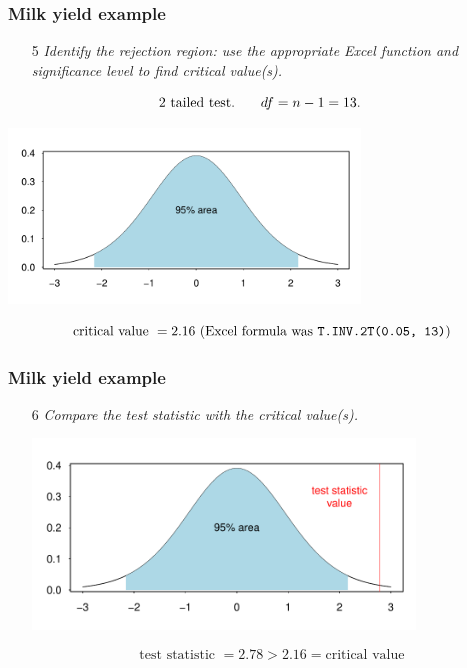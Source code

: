 \documentclass[12pt,xcolor=dvipsnames,handout,mathserif,aspectratio=169]{beamer}
\begin{document}
\begin{frame}
\frametitle{Milk yield example}
\begin{enumerate}
\item[5] \emph{Identify the rejection region: use the appropriate Excel function and significance level to find critical value(s).\\}
\end{enumerate}
$$\mbox{2 tailed test. } \hspace{0.5cm} df =  n - 1 = 13.$$ 
\vspace{-0.8cm}
\begin{center}
\includegraphics[width=0.7\textwidth]{t_plot.pdf}
\end{center}
$$\mbox{ critical value } = 2.16 \mbox{ (Excel formula was \texttt{T.INV.2T(0.05, 13)})}$$


\end{frame}

\begin{frame}\frametitle{Milk yield example}
\begin{enumerate}
\item[6] \emph{Compare the test statistic with the critical value(s).}
\begin{center}
\includegraphics[width=0.8\textwidth]{t_plot2.pdf}
\end{center}
$$\mbox{test statistic } = 2.78 > 2.16 = \mbox{critical value}$$
    \end{enumerate}
\end{frame}
\end{document}
